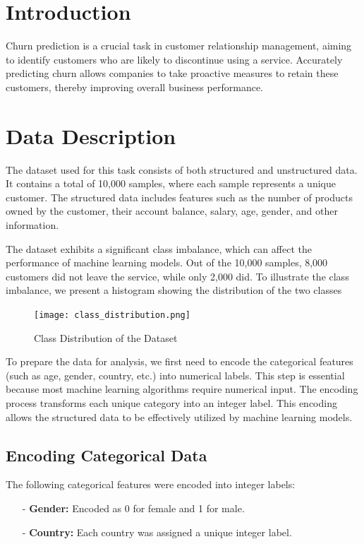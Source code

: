 \documentclass[12pt,titlepage]{article}
\begin{document}
\section{Introduction}
Churn prediction is a crucial task in customer relationship management, aiming to identify customers who are likely to discontinue using a service. Accurately predicting churn allows companies to take proactive measures to retain these customers, thereby improving overall business performance.

\section{Data Description}
The dataset used for this task consists of both structured and unstructured data. It contains a total of 10,000 samples, where each sample represents a unique customer. The structured data includes features such as the number of products owned by the customer, their account balance, salary, age, gender, and other information. 

The dataset exhibits a significant class imbalance, which can affect the performance of machine learning models. Out of the 10,000 samples, 8,000 customers did not leave the service, while only 2,000 did. To illustrate the class imbalance, we present a histogram showing the distribution of the two classes

\begin{figure}[h!]
    \centering
    \texttt{[image: class\_distribution.png]}
    \caption{Class Distribution of the Dataset}
    \label{fig:class_distribution}
\end{figure}

To prepare the data for analysis, we first need to encode the categorical features (such as age, gender, country, etc.) into numerical labels. This step is essential because most machine learning algorithms require numerical input. The encoding process transforms each unique category into an integer label. This encoding allows the structured data to be effectively utilized by machine learning models.

\subsection{Encoding Categorical Data}
The following categorical features were encoded into integer labels:
\begin{itemize}
    \item[-] \textbf{Gender:} Encoded as 0 for female and 1 for male.
    \item[-] \textbf{Country:} Each country was assigned a unique integer label.
\end{itemize}
 
\end{document}
